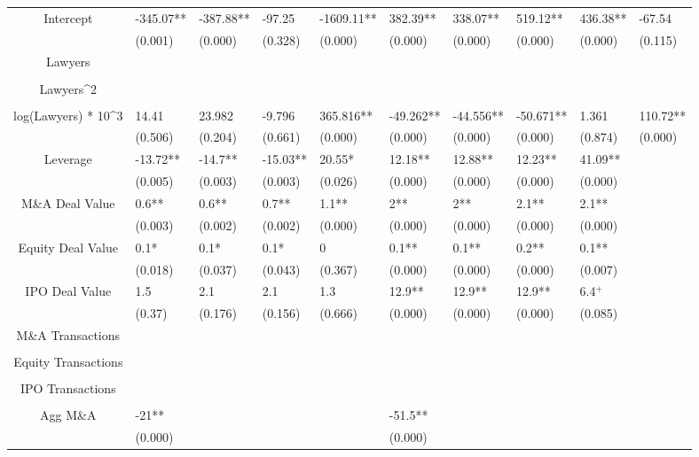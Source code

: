 \documentclass{article}
\begin{document}
\begin{table}[H]
\begin{tabular}{|clllllllll|}
Intercept & -345.07** & -387.88** & -97.25 & -1609.11** & 382.39** & 338.07** & 519.12** & 436.38** & -67.54 \\ 
   & (0.001) & (0.000) & (0.328) & (0.000) & (0.000) & (0.000) & (0.000) & (0.000) & (0.115) \\ 
  Lawyers &  &  &  &  &  &  &  &  &  \\ 
   &  &  &  &  &  &  &  &  &  \\ 
  Lawyers^2 &  &  &  &  &  &  &  &  &  \\ 
   &  &  &  &  &  &  &  &  &  \\ 
  log(Lawyers) * 10^3 & 14.41 & 23.982 & -9.796 & 365.816** & -49.262** & -44.556** & -50.671** & 1.361 & 110.72** \\ 
   & (0.506) & (0.204) & (0.661) & (0.000) & (0.000) & (0.000) & (0.000) & (0.874) & (0.000) \\ 
  Leverage & -13.72** & -14.7** & -15.03** & 20.55* & 12.18** & 12.88** & 12.23** & 41.09** &  \\ 
   & (0.005) & (0.003) & (0.003) & (0.026) & (0.000) & (0.000) & (0.000) & (0.000) &  \\ 
  M\&A Deal Value & 0.6** & 0.6** & 0.7** & 1.1** & 2** & 2** & 2.1** & 2.1** &  \\ 
   & (0.003) & (0.002) & (0.002) & (0.000) & (0.000) & (0.000) & (0.000) & (0.000) &  \\ 
  Equity Deal Value & 0.1* & 0.1* & 0.1* & 0 & 0.1** & 0.1** & 0.2** & 0.1** &  \\ 
   & (0.018) & (0.037) & (0.043) & (0.367) & (0.000) & (0.000) & (0.000) & (0.007) &  \\ 
  IPO Deal Value & 1.5 & 2.1 & 2.1 & 1.3 & 12.9** & 12.9** & 12.9** & 6.4$^{+}$ &  \\ 
   & (0.37) & (0.176) & (0.156) & (0.666) & (0.000) & (0.000) & (0.000) & (0.085) &  \\ 
  M\&A Transactions &  &  &  &  &  &  &  &  &  \\ 
   &  &  &  &  &  &  &  &  &  \\ 
  Equity Transactions &  &  &  &  &  &  &  &  &  \\ 
   &  &  &  &  &  &  &  &  &  \\ 
  IPO Transactions &  &  &  &  &  &  &  &  &  \\ 
   &  &  &  &  &  &  &  &  &  \\ 
  Agg M\&A & -21** &  &  &  & -51.5** &  &  &  &  \\ 
   & (0.000) &  &  &  & (0.000) &  &  &  &  \\ 

\end{tabular}
\end{table}
\end{document}
